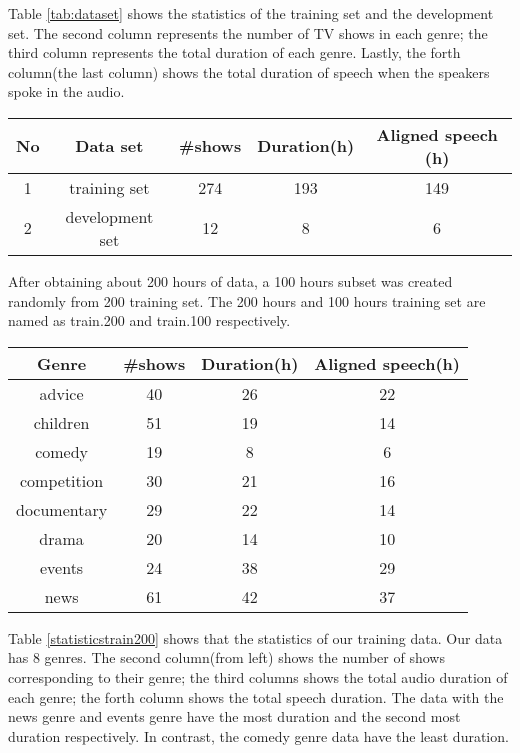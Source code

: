 Table \ref{tab:dataset} shows the statistics of the training set and the development set. The second column represents the number of TV shows in each genre; the third column represents the total duration of each genre. Lastly, the forth column(the last column) shows the total duration of speech when the speakers spoke in the audio.
\begin{center}
\label{tab:dataset}
\begin{tabular}{ | c | c | c | c | c |  }
\hline
No & Data set & \#shows & Duration(h) & Aligned speech (h) \\ \hline
1 & training set & 274 & 193  & 149 \\ \hline
2 & development set & 12 & 8 & 6 \\ \hline
\end{tabular}
\end{center}

 After obtaining about 200 hours of data, a 100 hours subset was created randomly from 200 training set. The 200 hours and 100 hours training set are named as train.200 and train.100 respectively. 

\begin{center}
\label{statisticstrain200}
\begin{tabular}{ | c | c | c | c|}
\hline
\textbf{Genre} & \textbf{\#shows}  & \textbf{Duration(h)} & Aligned speech(h) \\ \hline \hline
advice & 40 & 26 & 22 \\ \hline
children & 51 & 19 & 14 \\ \hline
comedy & 19 & 8 & 6 \\ \hline
competition & 30 & 21 & 16 \\ \hline
documentary & 29 & 22 & 14 \\ \hline
drama & 20 & 14 & 10 \\ \hline
events & 24 & 38 & 29 \\ \hline
news & 61 & 42 & 37 \\ \hline
\end{tabular}
\end{center}

Table \ref{statisticstrain200} shows that the statistics of our training data. Our data has 8 genres. The second column(from left) shows the number of shows corresponding to their genre; the third columns shows the total audio duration of each genre; the forth column shows the total speech duration. The data with the news genre and events genre  have the most duration and the second most duration respectively. In contrast, the comedy genre data have the least duration.

